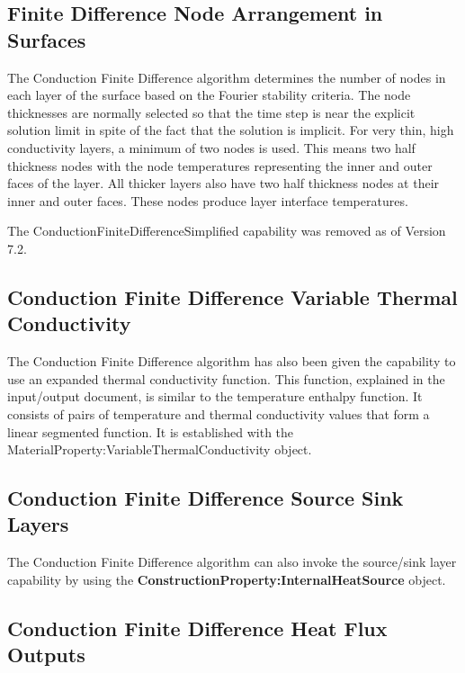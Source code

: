 \subsection{Finite Difference Node Arrangement in Surfaces}%
\label{finite-difference-node-arrangement-in-surfaces}

The Conduction Finite Difference algorithm determines the number of nodes in
each layer of the surface based on the Fourier stability criteria. The node
thicknesses are normally selected so that the time step is near the explicit
solution limit in spite of the fact that the solution is implicit. For very
thin, high conductivity layers, a minimum of two nodes is used. This means two
half thickness nodes with the node temperatures representing the inner and outer
faces of the layer. All thicker layers also have two half thickness nodes at
their inner and outer faces. These nodes produce layer interface temperatures.

The ConductionFiniteDifferenceSimplified capability was removed as of Version
7.2.

\subsection{Conduction Finite Difference Variable Thermal Conductivity}%
\label{conduction-finite-difference-variable-thermal-conductivity}

The Conduction Finite Difference algorithm has also been given the capability to
use an expanded thermal conductivity function. This function, explained in the
input/output document, is similar to the temperature enthalpy function. It
consists of pairs of temperature and thermal conductivity values that form a
linear segmented function. It is established with the
MaterialProperty:VariableThermalConductivity object.

\subsection{Conduction Finite Difference Source Sink Layers}%
\label{conduction-finite-difference-source-sink-layers}

The Conduction Finite Difference algorithm can also invoke the source/sink layer
capability by using the \textbf{ConstructionProperty:InternalHeatSource} object.

\subsection{Conduction Finite Difference Heat Flux Outputs}%
\label{conduction-finite-difference-heat-flux-outputs}

